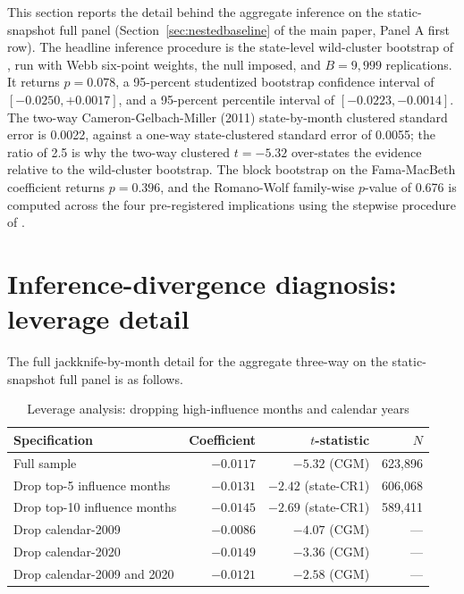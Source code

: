 \documentclass[12pt]{article}
\begin{document}
This section reports the detail behind the aggregate inference on the static-snapshot full panel (Section~\ref{sec:nestedbaseline} of the main paper, Panel A first row). The headline inference procedure is the state-level wild-cluster bootstrap of \citet{cameronGelbachMiller2008}, run with Webb six-point weights, the null imposed, and $B = 9{,}999$ replications. It returns $p = 0.078$, a 95-percent studentized bootstrap confidence interval of $[-0.0250, +0.0017]$, and a 95-percent percentile interval of $[-0.0223, -0.0014]$. The two-way Cameron-Gelbach-Miller (2011) state-by-month clustered standard error is 0.0022, against a one-way state-clustered standard error of 0.0055; the ratio of 2.5 is why the two-way clustered $t = -5.32$ over-states the evidence relative to the wild-cluster bootstrap. The block bootstrap on the Fama-MacBeth coefficient returns $p = 0.396$, and the Romano-Wolf family-wise $p$-value of 0.676 is computed across the four pre-registered implications using the stepwise procedure of \citet{romanoWolf2005}.

\section{Inference-divergence diagnosis: leverage detail}
\label{ia:divergence}

The full jackknife-by-month detail for the aggregate three-way on the static-snapshot full panel is as follows.

\begin{table}[h]
\centering
\caption{Leverage analysis: dropping high-influence months and calendar years}
\footnotesize
\begin{tabular}{lrrr}
\toprule
Specification & Coefficient & $t$-statistic & $N$ \\
\midrule
Full sample                       & $-0.0117$ & $-5.32$ (CGM)       & 623,896 \\
Drop top-5 influence months        & $-0.0131$ & $-2.42$ (state-CR1) & 606,068 \\
Drop top-10 influence months       & $-0.0145$ & $-2.69$ (state-CR1) & 589,411 \\
Drop calendar-2009                 & $-0.0086$ & $-4.07$ (CGM)       & --- \\
Drop calendar-2020                 & $-0.0149$ & $-3.36$ (CGM)       & --- \\
Drop calendar-2009 and 2020        & $-0.0121$ & $-2.58$ (CGM)       & --- \\
\bottomrule
\end{tabular}
\end{table}
\end{document}
